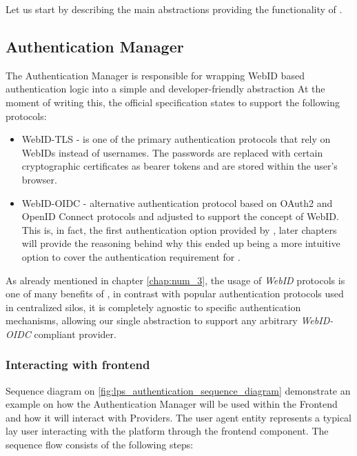 Let us start by describing the main abstractions providing the functionality of \lpas{}.

\subsection{Authentication Manager}
\label{sssec:authentication_manager}

The Authentication Manager is responsible for wrapping \solid{} WebID based authentication logic into a simple and developer-friendly abstraction At the moment of writing this, the official \solid{} specification states to support the following protocols:
\begin{itemize}
\item WebID-TLS  - is one of the primary authentication protocols that rely on WebIDs instead of usernames. The passwords are replaced with certain cryptographic certificates as bearer tokens and are stored within the user's browser.
\item WebID-OIDC - alternative authentication protocol based on OAuth2 and OpenID Connect protocols and adjusted to support the concept of WebID. This is, in fact, the first authentication option provided by \lpas{}, later chapters will provide the reasoning behind why this ended up being a more intuitive option to cover the authentication requirement for \lpa{}.   
\end{itemize}

As already mentioned in chapter \ref{chap:num_3}, the usage of \textit{WebID} protocols is one of many benefits of \solid{}, in contrast with popular authentication protocols used in centralized silos, it is completely agnostic to specific authentication mechanisms, allowing our single abstraction to support any arbitrary \textit{WebID-OIDC} compliant \solid{} provider. 


\subsubsection{Interacting with frontend}

Sequence diagram on \autoref{fig:lps_authentication_sequence_diagram} demonstrate an example on how the Authentication Manager will be used within the \lpa{} Frontend and how it will interact with \solid{} Providers. The user agent entity represents a typical lay \lpa{} user interacting with the platform through the frontend component. The sequence flow consists of the following steps:

